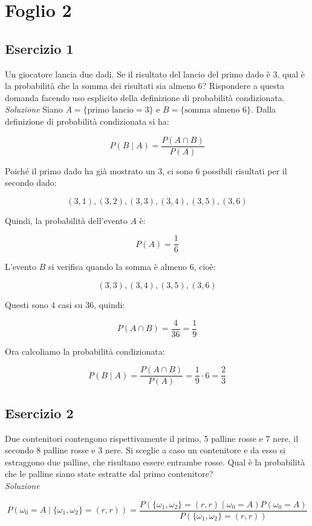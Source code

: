 \section{Foglio 2}
\subsection{Esercizio 1}
Un giocatore lancia due dadi. Se il risultato del lancio del primo dado è 3, qual è la probabilità che la somma dei risultati sia almeno 6? Rispondere a questa domanda facendo uso esplicito della definizione di probabilità condizionata.
\\

\textit{Soluzione} \quad Siano \( A=\{\text{primo lancio} = 3\} \) e \( B=\{\text{somma almeno } 6\} \). Dalla definizione di probabilità condizionata si ha:

\[
P(B\mid A)=\frac{P(A\cap B)}{P(A)}
\]

Poiché il primo dado ha già mostrato un 3, ci sono 6 possibili risultati per il secondo dado:

\[
(3,1), (3,2), (3,3), (3,4), (3,5), (3,6)
\]

Quindi, la probabilità dell'evento \( A \) è:

\[
P(A) = \frac{1}{6}
\]

L'evento \( B \) si verifica quando la somma è almeno 6, cioè:

\[
(3,3), (3,4), (3,5), (3,6)
\]

Questi sono 4 casi su 36, quindi:

\[
P(A\cap B) = \frac{4}{36} = \frac{1}{9}
\]

Ora calcoliamo la probabilità condizionata:

\[
P(B\mid A) = \frac{P(A\cap B)}{P(A)} = \frac{1}{9} \cdot 6 = \frac{2}{3}
\]


\subsection{Esercizio 2} Due contenitori contengono rispettivamente il primo, 5 palline rosse e 7 nere, il secondo 8 palline rosse e 3 nere. Si sceglie a caso un contenitore e da esso si estraggono due palline, che risultano essere entrambe rosse. Qual è la probabilità che le palline siano state estratte dal primo contenitore?
\\

\textit{Soluzione} \quad


\[
P(\omega_0 = A \mid \{ \omega_1, \omega_2 \} = (r,r)) =
\frac{P(\{ \omega_1, \omega_2 \} = (r,r) \mid \omega_0 = A) P(\omega_0 = A)}
{P(\{ \omega_1, \omega_2 \} = (r,r))}
\]

